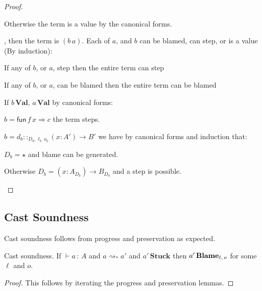 \begin{proof}
\begin{casenv}
\begin{casenv}
\begin{casenv}
     \item Otherwise the term is a value by the canonical forms.
   \end{casenv}
 \end{casenv}
 \item {}, then the term is $(b\,a)$.
  Each of $a$, and $b$ can be blamed, can step, or is a value (By induction):
  \begin{casenv}
    \item If any of $b$, or $a$, step then the entire term can step
    \item If any of $b$, or $a$, can be blamed then the entire term can be blamed
    \item If $b\,\textbf{Val}$, $a\,\textbf{Val}$ by canonical forms:
    \begin{casenv}
      \item $b=\mathsf{fun}\,f\,x\Rightarrow c$ the term steps.
      \item $b=d_{b}::_{D_{b},\ell _{b}\,o_{b}}\left(x:A'\right)\rightarrow B'$ we have by canonical forms and induction that:
      \begin{casenv}
        \item $D_{b}=\star$ and blame can be generated.
        \item Otherwise $D_{b}=\left(x:A_{D_{b}}\right)\rightarrow B_{D_{b}}$ and a step is possible.
      \end{casenv}
    \end{casenv}
  \end{casenv}
\end{casenv}
\end{proof}
 
\subsection{Cast Soundness}
 
 
Cast soundness follows from progress and preservation as expected.
 
\begin{thm} Cast soundness.
If $\vdash a\,:\,A$ and $a\rightsquigarrow_\ast a'$ and $a'\,\textbf{Stuck}$ then $a'\,\textbf{Blame}{}_{\ell,\,o}$ for some $\ell$ and $o$.
\end{thm}
\begin{proof}
This follows by iterating the progress and preservation lemmas.
\end{proof}

